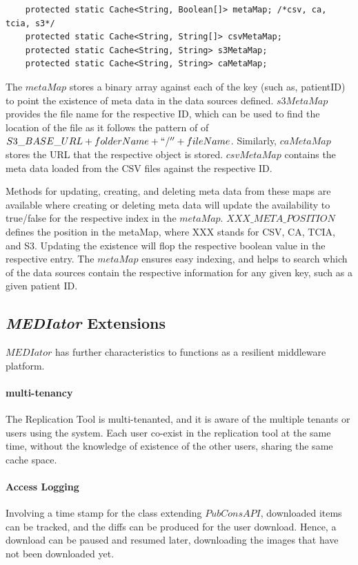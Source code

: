 \documentclass[conference]{IEEEtran}
\begin{document}
\begin{lstlisting}  
    protected static Cache<String, Boolean[]> metaMap; /*csv, ca, tcia, s3*/
    protected static Cache<String, String[]> csvMetaMap;
    protected static Cache<String, String> s3MetaMap;
    protected static Cache<String, String> caMetaMap;
\end{lstlisting} 
The $metaMap$ stores a binary array against each of the key (such as, patientID) to point the existence of meta data in the data sources defined. $s3MetaMap$ provides the file name for the respective ID, which can be used to find the location of the file as it follows the pattern of of $S3\_BASE\_URL + folderName + ``/'' + fileName$. Similarly, $caMetaMap$ stores the URL that the respective object is stored. $csvMetaMap$ contains the meta data loaded from the CSV files against the respective ID.

Methods for updating, creating, and deleting meta data from these maps are available where creating or deleting meta data will update the availability to true/false for the respective index in the $metaMap$. $XXX\_META\_POSITION$ defines the position in the metaMap, where XXX stands for CSV, CA, TCIA, and S3. Updating the existence will flop the respective boolean value in the respective entry. The $metaMap$ ensures easy indexing, and helps to search which of the data sources contain the respective information for any given key, such as a given patient ID.

\subsection{\textit{MEDIator} Extensions}
$MEDIator$ has further characteristics to functions as a resilient middleware platform.
\paragraph*{multi-tenancy}
The Replication Tool is multi-tenanted, and it is aware of the multiple tenants or users using the system. Each user co-exist in the replication tool at the same time, without the knowledge of existence of the other users, sharing the same cache space. 

\paragraph*{Access Logging}
Involving a time stamp for the class extending $PubConsAPI$, downloaded items can be tracked, and the diffs can be produced for the user download. Hence, a download can be paused and resumed later, downloading the images that have not been downloaded yet.
\end{document}
